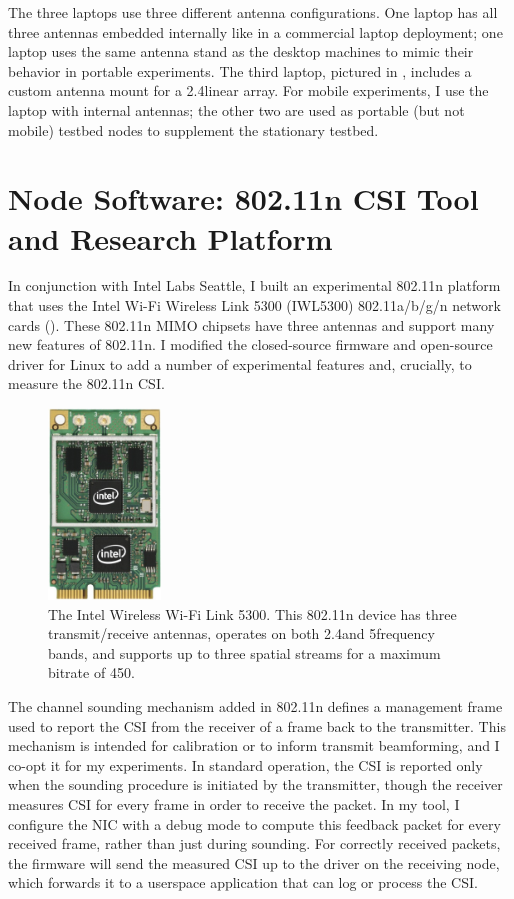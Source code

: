 The three laptops use three different antenna configurations. One laptop has all three antennas embedded internally like in a commercial laptop deployment; one laptop uses the same antenna stand as the desktop machines to mimic their behavior in portable experiments. The third laptop, pictured in , includes a custom antenna mount for a 2.4\GHz linear array. For mobile experiments, I use the laptop with internal antennas; the other two are used as portable (but not mobile) testbed nodes to supplement the stationary testbed.

\section{Node Software: 802.11n CSI Tool and Research Platform}
\label{sec:platform}
In conjunction with Intel Labs Seattle, I built an experimental 802.11n platform that uses the Intel Wi-Fi Wireless Link 5300 (IWL5300) 802.11a/b/g/n network cards (). These 802.11n MIMO chipsets have three antennas and support many new features of 802.11n. I modified the closed-source firmware and open-source  driver for Linux to add a number of experimental features and, crucially, to measure the 802.11n CSI.

\begin{figure}
	\centering
	\includegraphics[height=2in]{figures/iwlwifi-5300.jpg}
	\caption[The Intel Wireless Wi-Fi Link 5300]{\label{fig:iwl5300}The Intel Wireless Wi-Fi Link 5300. This 802.11n device has three transmit/receive antennas, operates on both 2.4\GHz and 5\GHz frequency bands, and supports up to three spatial streams for a maximum bitrate of 450\Mbps.}
\end{figure}

 The channel sounding mechanism added in 802.11n defines a management frame used to report the CSI from the receiver of a frame back to the transmitter. This mechanism is intended for calibration or to inform transmit beamforming, and I co-opt it for my experiments. In standard operation, the CSI is reported only when the sounding procedure is initiated by the transmitter, though the receiver measures CSI for every frame in order to receive the packet. In my tool, I configure the NIC with a debug mode to compute this feedback packet for every received frame, rather than just during sounding. For correctly received packets, the firmware will send the measured CSI up to the driver on the receiving node, which forwards it to a userspace application that can log or process the CSI.

